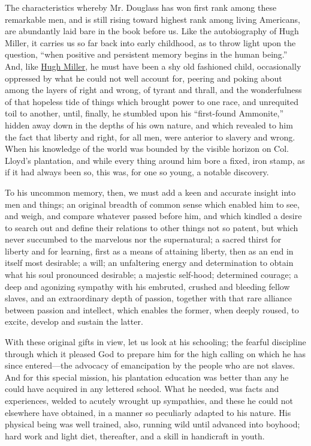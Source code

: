 The characteristics whereby Mr. Douglass has won first rank among these
remarkable men, and is still rising toward highest rank among living
Americans, are abundantly laid bare in the book before us. Like the
autobiography of Hugh Miller, it carries us so far back into early
childhood, as to throw light upon the question, ``when positive and
persistent memory begins in the human being.'' And, like
\href{/wiki/Author:Hugh_Miller_(1802-1856)}{Hugh Miller}, he must have
been a shy old fashioned child, occasionally oppressed by what he could
not well account for, peering and poking about among the layers of right
and wrong, of tyrant and thrall, and the wonderfulness of that hopeless
tide of things which brought power to one race, and unrequited toil to
another, until, finally, he stumbled upon his ``first-found Ammonite,''
hidden away down in the depths of his own nature, and which revealed to
him the fact that liberty and right, for all men, were anterior to
slavery and wrong. When his knowledge of the world was bounded by the
visible horizon on Col. Lloyd's plantation, and while every thing around
him bore a fixed, iron stamp, as if it had always been so, this was, for
one so young, a notable discovery.

To his uncommon memory, then, we must add a keen and accurate insight
into men and things; an original breadth of common sense which enabled
him to see, and weigh, and compare whatever passed before him, and which
kindled a desire to search out and define their relations to other
things not so patent, but which never {}succumbed to the marvelous nor
the supernatural; a sacred thirst for liberty and for learning, first as
a means of attaining liberty, then as an end in itself most desirable; a
will; an unfaltering energy and determination to obtain what his soul
pronounced desirable; a majestic self-hood; determined courage; a deep
and agonizing sympathy with his embruted, crushed and bleeding fellow
slaves, and an extraordinary depth of passion, together with that rare
alliance between passion and intellect, which enables the former, when
deeply roused, to excite, develop and sustain the latter.

With these original gifts in view, let us look at his schooling; the
fearful discipline through which it pleased God to prepare him for the
high calling on which he has since entered---the advocacy of
emancipation by the people who are not slaves. And for this special
mission, his plantation education was better than any he could have
acquired in any lettered school. What he needed, was facts and
experiences, welded to acutely wrought up sympathies, and these he could
not elsewhere have obtained, in a manner so peculiarly adapted to his
nature. His physical being was well trained, also, running wild until
advanced into boyhood; hard work and light diet, thereafter, and a skill
in handicraft in youth.

